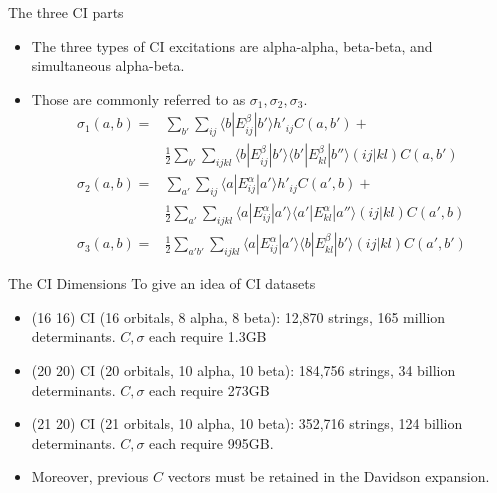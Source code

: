 \documentclass{beamer}
\newcommand{\bra}[1]{\langle #1|}
\newcommand{\ket}[1]{|#1\rangle}
\begin{document}
\begin{frame}{The three CI parts}
\begin{itemize}
\item The three types of CI excitations are alpha-alpha, beta-beta, and simultaneous alpha-beta.
\item Those are commonly referred to as $\sigma_1, \sigma_2, \sigma_3$. \\
\begin{align*}
\sigma_1(a,b) =& \sum_{b'} \sum_{ij}   { \bra{b} E_{ij}^{\beta} \ket{b'} h'_{ij} C(a,b') } + \\
& \frac{1}{2} \sum_{b'} \sum_{ijkl} { \bra{b} E_{ij}^{\beta} \ket{b'} \bra{b'} E_{kl}^{\beta} \ket{b''} (ij|kl) C(a,b') }
\\
\sigma_2(a,b) =&
  \sum_{a'} \sum_{ij}   { \bra{a} E_{ij}^{\alpha} \ket{a'} h'_{ij} C(a',b) } + \\
& \frac{1}{2} \sum_{a'} \sum_{ijkl} { \bra{a} E_{ij}^{\alpha} \ket{a'} \bra{a'} E_{kl}^{\alpha} \ket{a''} (ij|kl) C(a',b) }
 \\
\sigma_3(a,b) =& \frac{1}{2}\sum_{a'b'} \sum_{ijkl} {
  \bra{a} E_{ij}^{\alpha} \ket{a'} \bra{b} E_{kl}^{\beta} \ket{b'} (ij|kl) C(a',b')
}
\end{align*}
\end{itemize}
\end{frame}

\begin{frame}{The CI Dimensions}
 To give an idea of CI datasets
\begin{itemize}
\item (16 16) CI (16 orbitals, 8 alpha, 8 beta): 12,870 strings, 165 million determinants.  $C, \sigma$ each require 1.3GB
\item (20 20) CI (20 orbitals, 10 alpha, 10 beta): 184,756 strings, 34 billion determinants.  $C, \sigma$ each require 273GB
\item (21 20) CI (21 orbitals, 10 alpha, 10 beta): 352,716 strings, 124 billion determinants.  $C, \sigma$ each require 995GB.
\item Moreover, previous $C$ vectors must be retained in the Davidson expansion.
\end{itemize}
\end{frame}
\end{document}
